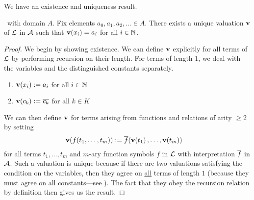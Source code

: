 We have an existence and uniqueness result.
\begin{boxlemma}\label{Ch2:Lemma:Valuation_Existence_Uniqueness}
    \Letal\ with domain $A$. Fix elements $a_0, a_1, a_2, \ldots \in A$. There exists a unique valuation $\mathbf{v}$ of $\mathcal{L}$ in $\mathcal{A}$ such that $\mathbf{v}\!\left( x_i \right) = a_i$ for all $i \in \mathbb{N}$.
\end{boxlemma}
\begin{proof}
    We begin by showing existence. We can define $\mathbf{v}$ explicitly for all terms of $\mathcal{L}$ by performing recursion on their length. For terms of length $1$, we deal with the variables and the distinguished constants separately.
    \begin{enumerate}
        \item $\mathbf{v}\!\left( x_i \right) := a_i$ for all $i \in \mathbb{N}$
        \item $\mathbf{v}\!\left( c_k \right) := \overline{c_k}$ for all $k \in K$
    \end{enumerate}
    We can then define $\mathbf{v}$ for terms arising from functions and relations of arity $\geq 2$ by setting
    \begin{align*}
        \mathbf{v}\!\left( f\!\left( t_1, \ldots, t_m \right) \right) &:= \overline{f}\!\left( \mathbf{v}\!\left( t_1 \right), \ldots, \mathbf{v}\!\left( t_m \right) \right)
    \end{align*}
    for all terms $t_1, \ldots, t_m$ and $m$-ary function symbols $f$ in $\mathcal{L}$ with interpretation $\overline{f}$ in $\mathcal{A}$. Such a valuation is unique because if there are two valuations satisfying the condition on the variables, then they agree on \underline{all} terms of length $1$ (because they must agree on all constants---see ). The fact that they obey the recursion relation by definition then gives us the result.
\end{proof}


